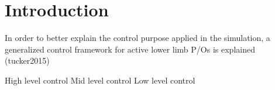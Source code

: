 \chapter{Introduction}


In order to better explain the control purpose applied in the simulation, a generalized control framework for active lower limb P/Os is explained (tucker2015)

High level control
Mid level control
Low level control